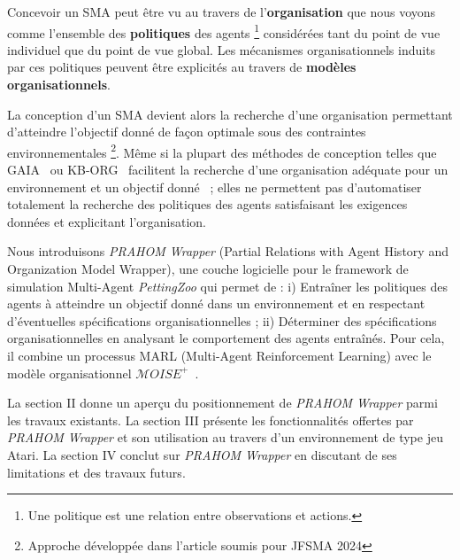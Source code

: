 \documentclass[demonstration]{jfsma}
\newcommand{\jp}[1]{\textbf{\color{red} JPJ: #1}}
\newcounter{relation}
\begin{document}

Concevoir un SMA peut être vu au travers de l'\textbf{organisation} que nous voyons comme l'ensemble des \textbf{politiques} des agents
\footnote{Une politique est une relation entre observations et actions.}
considérées tant du point de vue individuel que du point de vue global. Les mécanismes organisationnels induits par ces politiques peuvent être explicités au travers de \textbf{modèles organisationnels}.



La conception d'un SMA devient alors la recherche d'une organisation permettant d'atteindre l'objectif donné de façon optimale sous des contraintes environnementales
\footnote{Approche développée dans l'article  soumis pour JFSMA 2024 }.
Même si la plupart des méthodes de conception telles que GAIA~\cite{Cernuzzi2014} ou KB-ORG~\cite{Sims2008} facilitent la recherche d'une organisation adéquate pour un environnement et un objectif donné~\cite{Mefteh2013} ; elles ne permettent pas d'automatiser totalement la recherche des politiques des agents satisfaisant les exigences données et explicitant l'organisation.

Nous introduisons \emph{PRAHOM Wrapper} (Partial Relations with Agent History and Organization Model Wrapper), une couche logicielle pour le framework de simulation Multi-Agent \emph{PettingZoo} qui permet de :
%
i) Entraîner les politiques des agents à atteindre un objectif donné dans un environnement et en respectant d'éventuelles spécifications organisationnelles ;\quad
ii) Déterminer des spécifications organisationnelles %
en analysant le comportement des agents entraînés.
%
Pour cela, il combine un processus MARL (Multi-Agent Reinforcement Learning) avec le modèle organisationnel $\mathcal{M}OISE^+$~\cite{Hubner2007}.

La section II donne un aperçu du positionnement de \emph{PRAHOM Wrapper} parmi les travaux existants.
La section III  présente les fonctionnalités offertes par \emph{PRAHOM Wrapper} et son utilisation au travers d'un environnement de type jeu Atari.
La section IV conclut sur \emph{PRAHOM Wrapper} en discutant de ses limitations et des travaux futurs.
\end{document}
